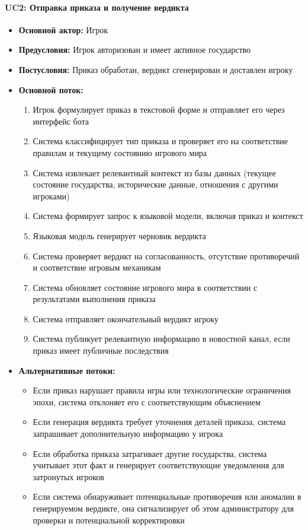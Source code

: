 \paragraph{UC2: Отправка приказа и получение вердикта}

\begin{itemize}
    \item \textbf{Основной актор:} Игрок
    \item \textbf{Предусловия:} Игрок авторизован и имеет активное государство
    \item \textbf{Постусловия:} Приказ обработан, вердикт сгенерирован и доставлен игроку
    \item \textbf{Основной поток:}
    \begin{enumerate}
        \item Игрок формулирует приказ в текстовой форме и отправляет его через интерфейс бота
        \item Система классифицирует тип приказа и проверяет его на соответствие правилам и текущему состоянию игрового мира
        \item Система извлекает релевантный контекст из базы данных (текущее состояние государства, исторические данные, отношения с другими игроками)
        \item Система формирует запрос к языковой модели, включая приказ и контекст
        \item Языковая модель генерирует черновик вердикта
        \item Система проверяет вердикт на согласованность, отсутствие противоречий и соответствие игровым механикам
        \item Система обновляет состояние игрового мира в соответствии с результатами выполнения приказа
        \item Система отправляет окончательный вердикт игроку
        \item Система публикует релевантную информацию в новостной канал, если приказ имеет публичные последствия
    \end{enumerate}
    \item \textbf{Альтернативные потоки:}
    \begin{itemize}
        \item Если приказ нарушает правила игры или технологические ограничения эпохи, система отклоняет его с соответствующим объяснением
        \item Если генерация вердикта требует уточнения деталей приказа, система запрашивает дополнительную информацию у игрока
        \item Если обработка приказа затрагивает другие государства, система учитывает этот факт и генерирует соответствующие уведомления для затронутых игроков
        \item Если система обнаруживает потенциальные противоречия или аномалии в генерируемом вердикте, она сигнализирует об этом администратору для проверки и потенциальной корректировки
    \end{itemize}
\end{itemize}

